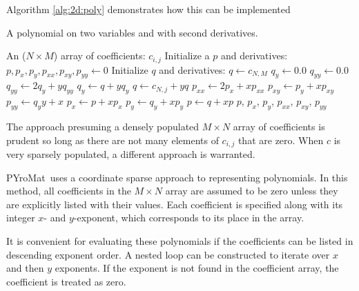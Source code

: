 \documentclass[letterpaper,11pt]{article}
\newcommand{\PM}{PYroMat}
\begin{document}
Algorithm \ref{alg:2d:poly} demonstrates how this can be implemented 

\begin{algorithm}
\caption{A polynomial on two variables and with second derivatives.}\label{alg:2d:poly}
\begin{algorithmic}
\REQUIRE An ($N\times M$) array of coefficients: $c_{i,j}$
\STATE Initialize a $p$ and derivatives:
\STATE $p, p_x, p_y, p_{xx}, p_{xy}, p_{yy} \leftarrow 0$
    \STATE Initialize $q$ and derivatives:
    \STATE $q \leftarrow c_{N,M}$
    \STATE $q_y \leftarrow 0.0$
    \STATE $q_{yy} \leftarrow 0.0$
        \STATE $q_{yy} \leftarrow 2 q_y + y q_{yy}$
        \STATE $q_y \leftarrow q + y q_y$
        \STATE $q \leftarrow c_{N,j} + y q$
    \ENDFOR
    \STATE $p_{xx} \leftarrow 2 p_x + x p_{xx}$
    \STATE $p_{xy} \leftarrow p_y + x p_{xy}$
    \STATE $p_{yy} \leftarrow q_yy + x $
    \STATE $p_x \leftarrow p + x p_x$
    \STATE $p_y \leftarrow q_y + x p_y$
    \STATE $p \leftarrow q + x p$
\ENDFOR
\RETURN $p$, $p_x$, $p_y$, $p_{xx}$, $p_{xy}$, $p_{yy}$
\end{algorithmic}
\end{algorithm}

The approach presuming a densely populated $M\times N$ array of coefficients is prudent so long as there are not many elements of $c_{i,j}$ that are zero.  When $c$ is very sparsely populated, a different approach is warranted.  

\PM\ uses a coordinate sparse approach to representing polynomials.  In this method, all coefficients in the $M \times N$ array are assumed to be zero unless they are explicitly listed with their values.  Each coefficient is specified along with its integer $x$- and $y$-exponent, which corresponds to its place in the array.

It is convenient for evaluating these polynomials if the coefficients can be listed in descending exponent order.  A nested loop can be constructed to iterate over $x$ and then $y$ exponents.  If the exponent is not found in the coefficient array, the coefficient is treated as zero.  
\end{document}
